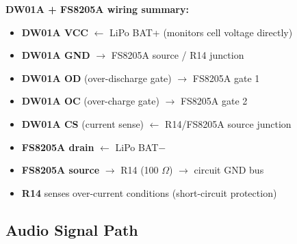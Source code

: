 \documentclass[a4paper,11pt]{article}
\renewcommand*{\,}{ }%
\begin{document}
\begin{infobox}
\textbf{DW01A + FS8205A wiring summary:}
\begin{itemize}[noitemsep]
  \item \textbf{DW01A VCC} $\leftarrow$ LiPo BAT+ (monitors cell voltage directly)
  \item \textbf{DW01A GND} $\rightarrow$ FS8205A source / R14 junction
  \item \textbf{DW01A OD} (over-discharge gate) $\rightarrow$ FS8205A gate 1
  \item \textbf{DW01A OC} (over-charge gate) $\rightarrow$ FS8205A gate 2
  \item \textbf{DW01A CS} (current sense) $\leftarrow$ R14/FS8205A source junction
  \item \textbf{FS8205A drain} $\leftarrow$ LiPo BAT$-$
  \item \textbf{FS8205A source} $\rightarrow$ R14 (100\,$\Omega$) $\rightarrow$ circuit GND bus
  \item \textbf{R14} senses over-current conditions (short-circuit protection)
\end{itemize}
\end{infobox}

\subsection{Audio Signal Path}
\end{document}
